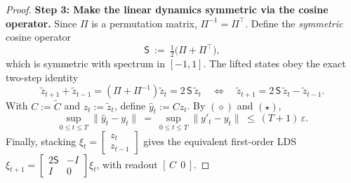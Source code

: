 \documentclass[10pt,a4paper]{amsart}
\begin{document}
\begin{proof}
\textbf{Step 3: Make the linear dynamics symmetric via the cosine operator.}
Since $\Pi$ is a permutation matrix, $\Pi^{-1}=\Pi^\top$.
Define the \emph{symmetric} cosine operator
\[
\mathsf{S}\ :=\ \tfrac12\big(\Pi+\Pi^\top\big),
\]
which is symmetric with spectrum in $[-1,1]$.
The lifted states obey the exact two-step identity
\[
\tilde z_{t+1}+ \tilde z_{t-1}=(\Pi+\Pi^{-1})\tilde z_t=2\,\mathsf{S}\,\tilde z_t
\quad\Longleftrightarrow\quad
\tilde z_{t+1}=2\,\mathsf{S}\,\tilde z_t-\tilde z_{t-1}.
\]
With $C:=\tilde C$ and $z_t:=\tilde z_t$, define $\hat y_t:=C z_t$.
By $(\diamond)$ and $(\star)$,
\[
\sup_{0\le t\le T}\|\hat y_t-y_t\|\ =\ \sup_{0\le t\le T}\|y'_t-y_t\|\ \le\ (T+1)\,\varepsilon.
\]
Finally, stacking $\xi_t=\begin{bmatrix}z_t\\ z_{t-1}\end{bmatrix}$ gives the equivalent first-order LDS
$\xi_{t+1}=\begin{bmatrix}2\mathsf{S}&-I\\ I&0\end{bmatrix}\xi_t$, with readout $[\,C\ \ 0\,]$.
\end{proof}
\end{document}
